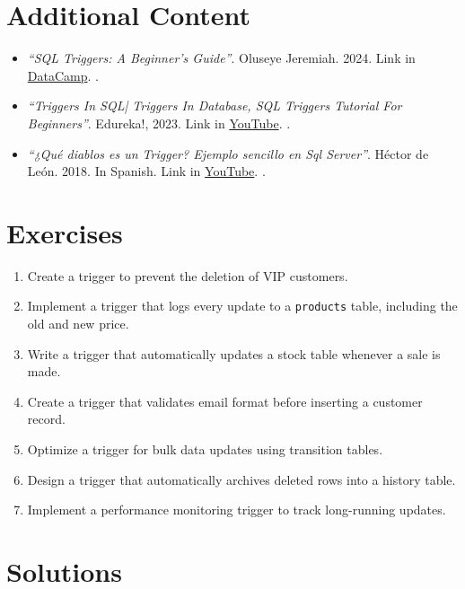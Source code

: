 \documentclass{article}
\begin{document}
\section{Additional Content}

\begin{itemize}
    \item\textit{``SQL Triggers: A Beginner's Guide''}. Oluseye Jeremiah. 2024. Link in  \href{https://www.datacamp.com/tutorial/sql-triggers}{DataCamp}. \cite{datacamp_sql_triggers}.
    \item \textit{``Triggers In SQL| Triggers In Database, SQL Triggers Tutorial For Beginners''}. Edureka!, 2023. Link in \href{https://www.youtube.com/watch?v=MhsL8ke7IJY}{YouTube}. \cite{edureka_sql_triggers}.
    \item \textit{``¿Qué diablos es un Trigger? Ejemplo sencillo en Sql Server''}. Héctor de León. 2018. In Spanish. Link in  \href{https://www.youtube.com/watch?v=uTx7xd4ojkk}{YouTube}. \cite{hdeleon_trigger_sqlserver}.
\end{itemize}

\section{Exercises}
\begin{enumerate}
    \item Create a trigger to prevent the deletion of VIP customers.
    \item Implement a trigger that logs every update to a \texttt{products} table, including the old and new price.
    \item Write a trigger that automatically updates a stock table whenever a sale is made.
    \item Create a trigger that validates email format before inserting a customer record.
    \item Optimize a trigger for bulk data updates using transition tables.
    \item Design a trigger that automatically archives deleted rows into a history table.
    \item Implement a performance monitoring trigger to track long-running updates.
\end{enumerate}

\newpage

\section*{Solutions}
\end{document}
